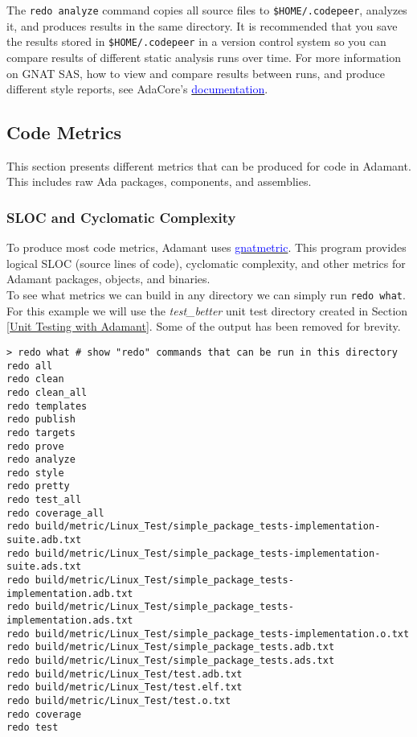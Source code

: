 The \texttt{redo analyze} command copies all source files to \texttt{\$HOME/.codepeer}, analyzes it, and produces results in the same directory. It is recommended that you save the results stored in \texttt{\$HOME/.codepeer} in a version control system so you can compare results of different static analysis runs over time. For more information on GNAT SAS, how to view and compare results between runs, and produce different style reports, see AdaCore's \href{https://docs.adacore.com/live/wave/gnatsas/html/user_guide/getting_started.html}{\textcolor{blue}{documentation}}.

\subsection{Code Metrics} \label{Code Metrics}

This section presents different metrics that can be produced for code in Adamant. This includes raw Ada packages, components, and assemblies.

\subsubsection{SLOC and Cyclomatic Complexity}

To produce most code metrics, Adamant uses \href{https://gcc.gnu.org/onlinedocs/gcc-4.8.4/gnat_ugn/The-GNAT-Metric-Tool-gnatmetric.html}{\textcolor{blue}{gnatmetric}}. This program provides logical SLOC (source lines of code), cyclomatic complexity, and other metrics for Adamant packages, objects, and binaries. \\

To see what metrics we can build in any directory we can simply run \texttt{redo what}. For this example we will use the \textit{test\_better} unit test directory created in Section \ref{Unit Testing with Adamant}. Some of the output has been removed for brevity.

\vspace{5mm} %
\begin{verbatim}
> redo what # show "redo" commands that can be run in this directory
redo all
redo clean
redo clean_all
redo templates
redo publish
redo targets
redo prove
redo analyze
redo style
redo pretty
redo test_all
redo coverage_all
redo build/metric/Linux_Test/simple_package_tests-implementation-suite.adb.txt
redo build/metric/Linux_Test/simple_package_tests-implementation-suite.ads.txt
redo build/metric/Linux_Test/simple_package_tests-implementation.adb.txt
redo build/metric/Linux_Test/simple_package_tests-implementation.ads.txt
redo build/metric/Linux_Test/simple_package_tests-implementation.o.txt
redo build/metric/Linux_Test/simple_package_tests.adb.txt
redo build/metric/Linux_Test/simple_package_tests.ads.txt
redo build/metric/Linux_Test/test.adb.txt
redo build/metric/Linux_Test/test.elf.txt
redo build/metric/Linux_Test/test.o.txt
redo coverage
redo test
\end{verbatim}
\vspace{5mm} %

